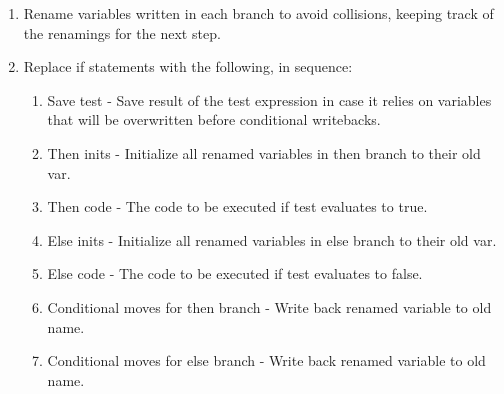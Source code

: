 \documentclass[sigplan, review]{acmart}
\begin{document}
\begin{enumerate}
   \item Rename variables written in each branch to avoid collisions, keeping track of the renamings for the next step.
   \item Replace if statements with the following, in sequence:
   \begin{enumerate}
       \item Save test - Save result of the test expression in case it relies on variables that will be overwritten before conditional writebacks.
       \item Then inits - Initialize all renamed variables in then branch to their old var.
       \item Then code - The code to be executed if test evaluates to true.
       \item Else inits - Initialize all renamed variables in else branch to their old var.
       \item Else code - The code to be executed if test evaluates to false.
       \item Conditional moves for then branch - Write back renamed variable to old name.
       \item Conditional moves for else branch - Write back renamed variable to old name.
   \end{enumerate}
\end{enumerate}
\end{document}
